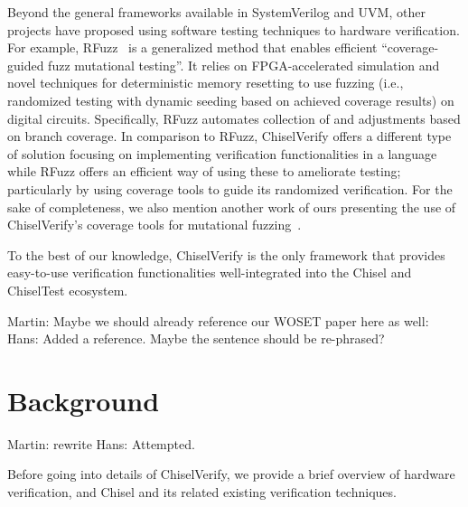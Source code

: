 \documentclass[conference]{IEEEtran}
\newcommand{\martin}[1]{{\color{blue} Martin: #1}}
\newcommand{\hjd}[1]{{\color{pink} Hans: #1}}
\begin{document}
Beyond the general frameworks available in SystemVerilog and UVM, other projects have proposed 
using software testing techniques to hardware verification. For example, RFuzz~\cite{rfuzz2018} 
is a generalized method that enables efficient ``coverage-guided fuzz mutational testing''. 
It relies on FPGA-accelerated simulation and novel techniques for deterministic memory 
resetting to use fuzzing (i.e., randomized testing with dynamic seeding based on achieved 
coverage results) on digital circuits. Specifically, RFuzz automates collection of and adjustments 
based on branch coverage. In comparison to RFuzz, ChiselVerify offers a different type 
of solution focusing on implementing verification functionalities in a language while 
RFuzz offers an efficient way of using these to ameliorate testing; particularly by using coverage 
tools to guide its randomized verification. For the sake of completeness, we also mention another 
work of ours presenting the use of ChiselVerify's coverage tools for mutational 
fuzzing~\cite{verify:fuzzing:2021}.


To the best of our knowledge, ChiselVerify is the only framework that provides easy-to-use verification functionalities well-integrated into the Chisel and ChiselTest ecosystem.

\martin{Maybe we should already reference our WOSET paper here as well: \cite{verify:fuzzing:2021}} \hjd{Added a reference. Maybe the sentence should be re-phrased?}





\section{Background}
\label{sec:background}

\martin{rewrite} \hjd{Attempted.}



Before going into details of ChiselVerify, we provide a brief overview of hardware verification, 
and Chisel and its related existing verification techniques.
\end{document}
